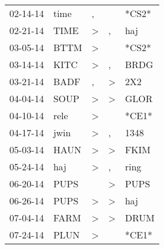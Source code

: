 \begin{supertabular}{p{0.07\textwidth}p{0.06\textwidth}p{0.02\textwidth}p{0.02\textwidth}p{0.06\textwidth}}
          02-14-14\textsuperscript{} &           time\textsuperscript{} &                , &                  &                            *CS2* \\
          02-21-14\textsuperscript{} &           TIME\textsuperscript{} &     \textgreater &                , &            haj\textsuperscript{} \\
          03-05-14\textsuperscript{} &           BTTM\textsuperscript{} &     \textgreater &                  &                            *CS2* \\
          03-14-14\textsuperscript{} &           KITC\textsuperscript{} &     \textgreater &                , &           BRDG\textsuperscript{} \\
          03-21-14\textsuperscript{} &           BADF\textsuperscript{} &                , &     \textgreater &            2X2\textsuperscript{} \\
          04-04-14\textsuperscript{} &           SOUP\textsuperscript{} &     \textgreater &     \textgreater &           GLOR\textsuperscript{} \\
          04-10-14\textsuperscript{} &           rele\textsuperscript{} &     \textgreater &                  &                            *CE1* \\
          04-17-14\textsuperscript{} &           jwin\textsuperscript{} &     \textgreater &                , &           1348\textsuperscript{} \\
          05-03-14\textsuperscript{} &           HAUN\textsuperscript{} &     \textgreater &     \textgreater &           FKIM\textsuperscript{} \\
          05-24-14\textsuperscript{} &            haj\textsuperscript{} &     \textgreater &                , &           ring\textsuperscript{} \\
          06-20-14\textsuperscript{} &           PUPS\textsuperscript{} &                  &     \textgreater &           PUPS\textsuperscript{} \\
          06-26-14\textsuperscript{} &           PUPS\textsuperscript{} &     \textgreater &     \textgreater &            haj\textsuperscript{} \\
          07-04-14\textsuperscript{} &           FARM\textsuperscript{} &     \textgreater &     \textgreater &           DRUM\textsuperscript{} \\
          07-24-14\textsuperscript{} &           PLUN\textsuperscript{} &     \textgreater &                  &                            *CE1* \\

\end{supertabular}
